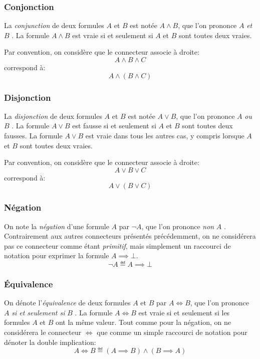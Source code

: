 \subsubsection{Conjonction}

La \textit{conjunction} de deux formules $A$ et $B$ est notée $A \wedge B$, que l'on prononce \og $A$ \textit{et} $B$ \fg{}.
La formule $A \wedge B$ est vraie si et seulement si $A$ et $B$ sont toutes deux vraies.

Par convention, on considère que le connecteur associe à droite:
\[
A \wedge B \wedge C
\]
correspond à:
\[
A \wedge (B \wedge C)
\]


\subsubsection{Disjonction}

La \textit{disjonction} de deux formules $A$ et $B$ est notée $A \vee B$, que l'on prononce \og $A$ \textit{ou} $B$ \fg{}.
La formule $A \vee B$ est fausse si et seulement si $A$ et $B$ sont toutes deux fausses.
La formule $A \vee B$ est vraie dans tous les autres cas, y compris lorsque $A$ et $B$ sont toutes deux vraies.

Par convention, on considère que le connecteur associe à droite:
\[
A \vee B \vee C
\]
correspond à:
\[
A \vee (B \vee C)
\]

\subsubsection{Négation}

On note la \textit{négation} d'une formule $A$ par $\neg A$, que l'on prononce \og \textit{non} $A$ \fg{}. Contrairement aux autres connecteurs présentés précédemment, on ne considérera pas ce connecteur comme étant \textit{primitif}, mais simplement un raccourci de notation pour exprimer la formule $A \implies \bot$.
\[
\neg A \eqdef A \implies \bot
\]

\subsubsection{Équivalence}

On dénote l'\textit{équivalence} de deux formules $A$ et $B$ par $A \iff B$, que l'on prononce \og $A$ \textit{si et seulement si} $B$ \fg{}. La formule $A \iff B$ est vraie si et seulement si les formules $A$ et $B$ ont la même valeur. Tout comme pour la négation, on ne considérera le connecteur ${\iff}$ que comme un simple raccourci de notation pour dénoter la double implication:
\[
A \iff B \eqdef (A \implies B) \wedge (B \implies A)
\]

